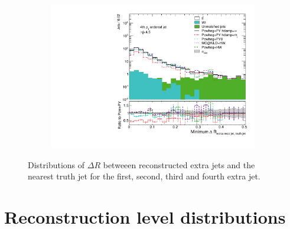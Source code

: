 \begin{figure}
\begin{subfigure}[]{0.45\textwidth}
\end{subfigure}
\begin{subfigure}[]{0.45\textwidth}
\includegraphics[width=\textwidth]{fig/MCComp/NLO/GrandPtVsTruthDRJet3.pdf}
\end{subfigure}
\caption{Distributions of $\Delta R$ betweeen reconstructed extra jets and the nearest truth jet for the first, second, third and fourth extra jet. }
\label{fig:truthdr}
\end{figure}
\section{Reconstruction level distributions}

